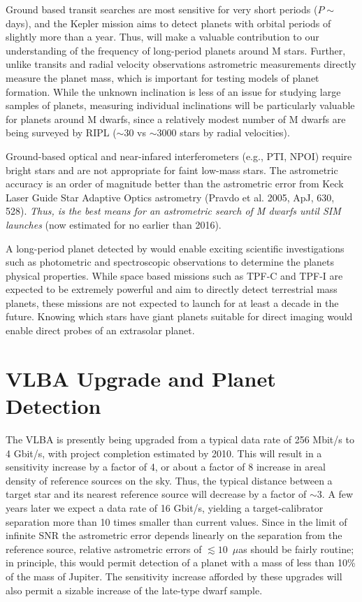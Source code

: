 \documentclass[12pt,preprint]{aastex}
\begin{document}
Ground based transit searches are most sensitive for very short
periods ($P \sim$ days), and the Kepler mission aims to detect planets
with orbital periods of slightly more than a year.  Thus, \ripl will
make a valuable contribution to our understanding of the frequency of
long-period planets around M stars.  Further, unlike transits and
radial velocity observations astrometric measurements directly measure
the planet mass, which is important for testing models of planet
formation.  While the unknown inclination is less of an issue for
studying large samples of planets, measuring individual inclinations
will be particularly valuable for planets around M dwarfs, since a
relatively modest number of M dwarfs are being surveyed by RIPL ($\sim
30$ vs $\sim 3000$ stars by radial velocities).

Ground-based optical and near-infared interferometers (e.g., PTI,
NPOI) require bright stars and are not appropriate for faint low-mass
stars.  The \ripl astrometric accuracy is an order of magnitude
better than the astrometric error from Keck Laser Guide Star Adaptive
Optics astrometry (Pravdo et al.  2005, ApJ, 630, 528).  
{\em Thus, \ripl is the best
means for an astrometric search of M dwarfs until SIM launches} (now
estimated for no earlier than 2016).


A long-period planet detected by \ripl would enable exciting
scientific investigations such as photometric and spectroscopic
observations to determine the planets physical properties.  While
space based missions such as TPF-C and TPF-I are expected to be
extremely powerful and aim to directly detect terrestrial mass
planets, these missions are not expected to launch for at least a
decade in the future.  Knowing which stars have giant planets suitable
for direct imaging would enable direct probes of an extrasolar planet.

\section{VLBA Upgrade and Planet Detection} 
\label{sec:VLBA}

The VLBA is presently being upgraded from a typical data rate of 256
Mbit/s to 4 Gbit/s, with project completion estimated by 2010.  This
will result in a sensitivity increase by a factor of 4, or about a
factor of 8 increase in areal density of reference sources on the sky.
Thus, the typical distance between a target star and its nearest
reference source will decrease by a factor of $\sim 3$.  A few years
later we expect a data rate of 16 Gbit/s, yielding a target-calibrator
separation more than 10 times smaller than current values.  Since in
the limit of infinite SNR the astrometric error depends linearly on
the separation from the reference source, relative astrometric errors
of $\lesssim 10$~$\mu$as should be fairly routine; in principle, this
would permit detection of a planet with a mass of less than 10\% of
the mass of Jupiter. The sensitivity increase afforded by these
upgrades will also permit a sizable increase of the late-type dwarf
sample.
\end{document}
